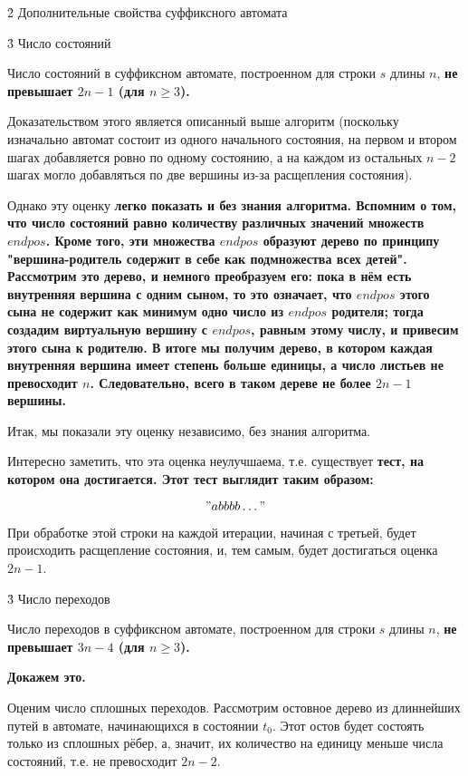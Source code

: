\h2{ Дополнительные свойства суффиксного автомата }


\h3{ Число состояний }

Число состояний в суффиксном автомате, построенном для строки $s$ длины $n$, \bf{не превышает $2n-1$} (для $n \ge 3$).

Доказательством этого является описанный выше алгоритм (поскольку изначально автомат состоит из одного начального состояния, на первом и втором шагах добавляется ровно по одному состоянию, а на каждом из остальных $n-2$ шагах могло добавляться по две вершины из-за расщепления состояния).

Однако эту оценку \bf{легко показать и без знания алгоритма}. Вспомним о том, что число состояний равно количеству различных значений множеств $endpos$. Кроме того, эти множества $endpos$ образуют дерево по принципу "вершина-родитель содержит в себе как подмножества всех детей". Рассмотрим это дерево, и немного преобразуем его: пока в нём есть внутренняя вершина с одним сыном, то это означает, что $endpos$ этого сына не содержит как минимум одно число из $endpos$ родителя; тогда создадим виртуальную вершину с $endpos$, равным этому числу, и привесим этого сына к родителю. В итоге мы получим дерево, в котором каждая внутренняя вершина имеет степень больше единицы, а число листьев не превосходит $n$. Следовательно, всего в таком дереве не более $2n-1$ вершины.

Итак, мы показали эту оценку независимо, без знания алгоритма.

Интересно заметить, что эта оценка неулучшаема, т.е. существует \bf{тест, на котором она достигается}. Этот тест выглядит таким образом:

$$ " abbbb \ldots " $$

При обработке этой строки на каждой итерации, начиная с третьей, будет происходить расщепление состояния, и, тем самым, будет достигаться оценка $2n-1$.


\h3{ Число переходов }

Число переходов в суффиксном автомате, построенном для строки $s$ длины $n$, \bf{не превышает $3n-4$} (для $n \ge 3$).

\bf{Докажем} это.

Оценим число сплошных переходов. Рассмотрим остовное дерево из длиннейших путей в автомате, начинающихся в состоянии $t_0$. Этот остов будет состоять только из сплошных рёбер, а, значит, их количество на единицу меньше числа состояний, т.е. не превосходит $2n-2$.

